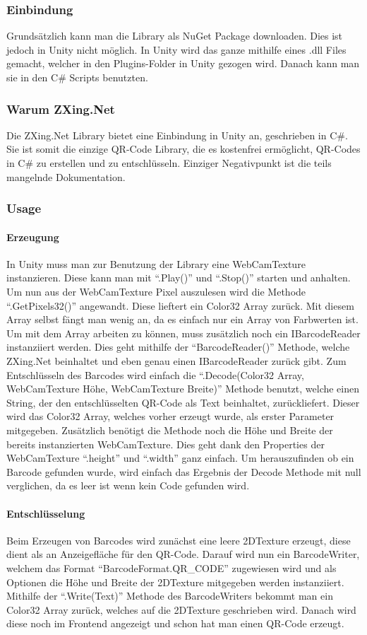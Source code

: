 \subsubsection{Einbindung}
Grundsätzlich kann man die Library als NuGet Package downloaden. Dies ist jedoch in Unity nicht möglich. In Unity wird das ganze mithilfe eines .dll Files gemacht, welcher in den Plugins-Folder in Unity gezogen wird. Danach kann man sie in den C\# Scripts benutzten.
\subsubsection{Warum ZXing.Net}
Die ZXing.Net Library bietet eine Einbindung in Unity an, geschrieben in C\#. Sie ist somit die einzige QR-Code Library, die es kostenfrei ermöglicht, QR-Codes in C\# zu erstellen und zu entschlüsseln. Einziger Negativpunkt ist die teils mangelnde Dokumentation.
\subsubsection{Usage}
\paragraph{Erzeugung}
In Unity muss man zur Benutzung der Library eine WebCamTexture instanzieren. Diese kann man mit “.Play()” und “.Stop()” starten und anhalten. Um nun aus der WebCamTexture Pixel auszulesen wird die Methode “.GetPixels32()” angewandt. Diese lieftert ein Color32 Array zurück. Mit diesem Array selbst fängt man wenig an, da es einfach nur ein Array von Farbwerten ist. Um mit dem Array arbeiten zu können, muss zusätzlich noch ein IBarcodeReader instanziiert werden. Dies geht mithilfe der “BarcodeReader()” Methode, welche ZXing.Net beinhaltet und eben genau einen IBarcodeReader zurück gibt. Zum Entschlüsseln des Barcodes wird einfach die “.Decode(Color32 Array, WebCamTexture Höhe, WebCamTexture Breite)” Methode benutzt, welche einen String, der den entschlüsselten QR-Code als Text beinhaltet, zurückliefert. Dieser wird das Color32 Array, welches vorher erzeugt wurde, als erster Parameter mitgegeben. Zusätzlich benötigt die Methode noch die Höhe und Breite der bereits instanzierten WebCamTexture. Dies geht dank den Properties der WebCamTexture “.height” und “.width”  ganz einfach. Um herauszufinden ob ein Barcode gefunden wurde, wird einfach das Ergebnis der Decode Methode mit null verglichen, da es leer ist wenn kein Code gefunden wird.
\paragraph{Entschlüsselung}
Beim Erzeugen von Barcodes wird zunächst eine leere 2DTexture erzeugt, diese dient als an Anzeigefläche für den QR-Code. Darauf wird nun ein BarcodeWriter, welchem das Format “BarcodeFormat.QR\_CODE” zugewiesen wird und als Optionen die Höhe und Breite der 2DTexture mitgegeben werden instanziiert. Mithilfe der “.Write(Text)” Methode des BarcodeWriters bekommt man ein Color32 Array zurück, welches auf die 2DTexture geschrieben wird. Danach wird diese noch im Frontend angezeigt und schon hat man einen QR-Code erzeugt.
